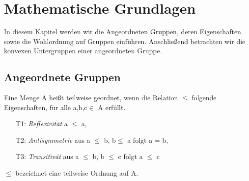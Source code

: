 \chapter{Mathematische Grundlagen}\label{chap2}
%
In diesem Kapitel werden wir die Angeordneten Gruppen, deren Eigenschaften sowie die Wohlordnung auf Gruppen einführen. Anschließend betrachten wir die konvexen Untergruppen einer angeordneten Gruppe.  
%
\section{Angeordnete Gruppen}
%
\begin{defn}\label{defgs}
Eine Menge A heißt teilweise geordnet, wenn die Relation $ \leqslant $ folgende Eigenschaften, für alle a,b,c$ \in $ A  erfüllt.
%
\begin{enumerate}
\item[T1:] \textit{Reflexivität} a $\leqslant $ a,
\item[T2:] \textit{Antisymmetrie} aus a $\leqslant $ b, b$ \leqslant $ a folgt a = b,
\item[T3:] \textit{Transitivät} aus a $ \leqslant $ b, b $\leqslant $ c folgt a $ \leqslant $ c
\end{enumerate}
%
$ \leqslant $ bezeichnet eine teilweise Ordnung auf A.
\end{defn}

